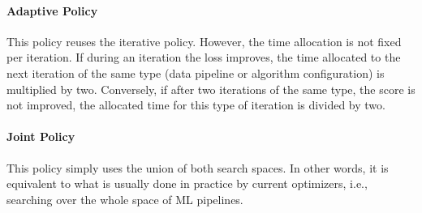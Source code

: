 \paragraph{Adaptive Policy}
This policy reuses the iterative policy.
However, the time allocation is not fixed per iteration.
If during an iteration the loss improves, the time allocated to the next iteration of the same type (data pipeline or algorithm configuration) is multiplied by two.
Conversely, if after two iterations of the same type, the score is not improved, the allocated time for this type of iteration is divided by two.

\paragraph{Joint Policy}
This policy simply uses the union of both search spaces.
In other words, it is equivalent to what is usually done in practice by current optimizers, i.e., searching over the whole space of ML pipelines.


